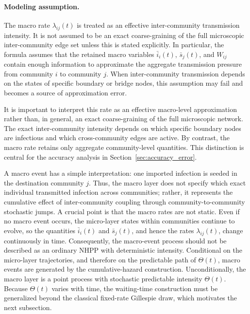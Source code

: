 \documentclass{article}
\begin{document}
\paragraph{Modeling assumption.}
The macro rate \(\lambda_{ij}(t)\) is treated as an effective inter-community transmission intensity. 
It is not assumed to be an exact coarse-graining of the full microscopic inter-community edge set unless this is stated explicitly. 
In particular, the formula assumes that the retained macro variables \(\bar{i}_i(t)\), \(\bar{s}_j(t)\), and \(W_{ij}\) contain enough information to approximate the aggregate transmission pressure from community \(i\) to community \(j\). 
When inter-community transmission depends on the states of specific boundary or bridge nodes, this assumption may fail and becomes a source of approximation error.

It is important to interpret this rate as an effective macro-level approximation rather than, in general, an exact coarse-graining of the full microscopic network. 
The exact inter-community intensity depends on which specific boundary nodes are infectious and which cross-community edges are active. 
By contrast, the macro rate retains only aggregate community-level quantities. 
This distinction is central for the accuracy analysis in Section~\ref{sec:accuracy_error}.


A macro event has a simple interpretation: one imported infection is seeded in the destination community \(j\). Thus, the macro layer does not specify which exact individual transmitted infection across communities; rather, it represents the cumulative effect of inter-community coupling through community-to-community stochastic jumps. A crucial point is that the macro rates are not static. Even if no macro event occurs, the micro-layer states within communities continue to evolve, so the quantities \(\bar{i}_i(t)\) and \(\bar{s}_j(t)\), and hence the rates \(\lambda_{ij}(t)\), change continuously in time. Consequently, the macro-event process should not be described as an ordinary NHPP with deterministic intensity. Conditional on the micro-layer trajectories, and therefore on the predictable path of \(\Theta(t)\), macro events are generated by the cumulative-hazard construction. Unconditionally, the macro layer is a point process with stochastic predictable intensity \(\Theta(t)\). Because \(\Theta(t)\) varies with time, the waiting-time construction must be generalized beyond the classical fixed-rate Gillespie draw, which motivates the next subsection.
\end{document}

